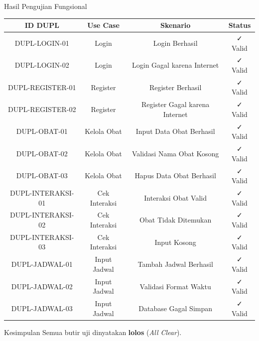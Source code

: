 \documentclass[10pt, aspectratio=169]{beamer}
\begin{document}
\begin{frame}{Hasil Pengujian Fungsional}
    \begin{table}[]
    \tiny
    \begin{tabular}{|c|c|c|c|}
        \hline
        \textbf{ID DUPL} & \textbf{Use Case} & \textbf{Skenario} & \textbf{Status} \\
        \hline
        DUPL-LOGIN-01 & Login & Login Berhasil & ✓ Valid \\
        DUPL-LOGIN-02 & Login & Login Gagal karena Internet & ✓ Valid \\
        DUPL-REGISTER-01 & Register & Register Berhasil & ✓ Valid \\
        DUPL-REGISTER-02 & Register & Register Gagal karena Internet & ✓ Valid \\
        DUPL-OBAT-01 & Kelola Obat & Input Data Obat Berhasil & ✓ Valid \\
        DUPL-OBAT-02 & Kelola Obat & Validasi Nama Obat Kosong & ✓ Valid \\
        DUPL-OBAT-03 & Kelola Obat & Hapus Data Obat Berhasil & ✓ Valid \\
        DUPL-INTERAKSI-01 & Cek Interaksi & Interaksi Obat Valid & ✓ Valid \\
        DUPL-INTERAKSI-02 & Cek Interaksi & Obat Tidak Ditemukan & ✓ Valid \\
        DUPL-INTERAKSI-03 & Cek Interaksi & Input Kosong & ✓ Valid \\
        DUPL-JADWAL-01 & Input Jadwal & Tambah Jadwal Berhasil & ✓ Valid \\
        DUPL-JADWAL-02 & Input Jadwal & Validasi Format Waktu & ✓ Valid \\
        DUPL-JADWAL-03 & Input Jadwal & Database Gagal Simpan & ✓ Valid \\
        \hline
    \end{tabular}
    \end{table}
    \vspace{0.3cm}
    \begin{block}{Kesimpulan}
        Semua butir uji dinyatakan \textbf{lolos} (\textit{All Clear}).
    \end{block}
\end{frame}
\end{document}
